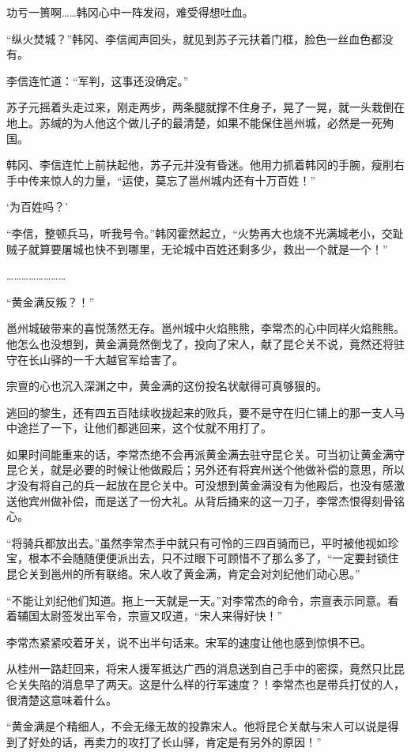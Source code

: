 功亏一篑啊……韩冈心中一阵发闷，难受得想吐血。

“纵火焚城？”韩冈、李信闻声回头，就见到苏子元扶着门框，脸色一丝血色都没有。

李信连忙道：“军判，这事还没确定。”

苏子元摇着头走过来，刚走两步，两条腿就撑不住身子，晃了一晃，就一头栽倒在地上。苏缄的为人他这个做儿子的最清楚，如果不能保住邕州城，必然是一死殉国。

韩冈、李信连忙上前扶起他，苏子元并没有昏迷。他用力抓着韩冈的手腕，瘦削右手中传来惊人的力量，“运使，莫忘了邕州城内还有十万百姓！”

‘为百姓吗？’

“李信，整顿兵马，听我号令。”韩冈霍然起立，“火势再大也烧不光满城老小，交趾贼子就算要屠城也快不到哪里，无论城中百姓还剩多少，救出一个就是一个！”

……………………

“黄金满反叛？！”

邕州城破带来的喜悦荡然无存。邕州城中火焰熊熊，李常杰的心中同样火焰熊熊。他怎么也没想到，黄金满竟然倒戈了，投向了宋人，献了昆仑关不说，竟然还将驻守在长山驿的一千大越官军给害了。

宗亶的心也沉入深渊之中，黄金满的这份投名状献得可真够狠的。

逃回的黎生，还有四五百陆续收拢起来的败兵，要不是守在归仁铺上的那一支人马中途拦了一下，让他们都逃回来，这个仗就不用打了。

如果时间能重来的话，李常杰绝不会再派黄金满去驻守昆仑关。可当初让黄金满守昆仑关，就是必要的时候让他做殿后；另外还有将宾州送个他做补偿的意思，所以才没有将自己的兵一起放在昆仑关中。可没想到黄金满没有为他殿后，也没有感激送他宾州做补偿，而是送了一份大礼。从背后捅来的这一刀子，李常杰恨得刻骨铭心。

“将骑兵都放出去。”虽然李常杰手中就只有可怜的三四百骑而已，平时被他视如珍宝，根本不会随随便便派出去，只不过眼下可顾惜不了那么多了，“一定要封锁住昆仑关到邕州的所有联络。宋人收了黄金满，肯定会对刘纪他们动心思。”

“不能让刘纪他们知道。拖上一天就是一天。”对李常杰的命令，宗亶表示同意。看着辅国太尉签发出军令，宗亶又叹道，“宋人来得好快！”

李常杰紧紧咬着牙关，说不出半句话来。宋军的速度让他也感到惊惧不已。

从桂州一路赶回来，将宋人援军抵达广西的消息送到自己手中的密探，竟然只比昆仑关失陷的消息早了两天。这是什么样的行军速度？！李常杰也是带兵打仗的人，很清楚这意味着什么。

“黄金满是个精细人，不会无缘无故的投靠宋人。他将昆仑关献与宋人可以说是得到了好处的话，再卖力的攻打了长山驿，肯定是有另外的原因！”

